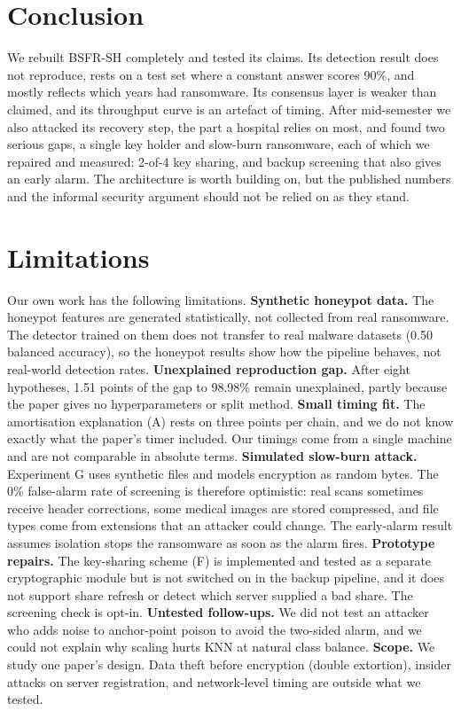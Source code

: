 \documentclass[11pt]{article}
\begin{document}
\section{Conclusion}
We rebuilt BSFR-SH completely and tested its claims. Its detection result does not reproduce,
rests on a test set where a constant answer scores 90\%, and mostly reflects which years had
ransomware. Its consensus layer is weaker than claimed, and its throughput curve is an artefact of
timing. After mid-semester we also attacked its recovery step, the part a hospital relies on most,
and found two serious gaps, a single key holder and slow-burn ransomware, each of which we
repaired and measured: 2-of-4 key sharing, and backup screening that also gives an early alarm.
The architecture is worth building on, but the published numbers and the informal security
argument should not be relied on as they stand.

\section*{Limitations}
Our own work has the following limitations.
\textbf{Synthetic honeypot data.} The honeypot features are generated statistically, not collected
from real ransomware. The detector trained on them does not transfer to real malware datasets
(0.50 balanced accuracy), so the honeypot results show how the pipeline behaves, not real-world
detection rates.
\textbf{Unexplained reproduction gap.} After eight hypotheses, 1.51 points of the gap to 98.98\%
remain unexplained, partly because the paper gives no hyperparameters or split method.
\textbf{Small timing fit.} The amortisation explanation (A) rests on three points per chain, and we
do not know exactly what the paper's timer included. Our timings come from a single machine and
are not comparable in absolute terms.
\textbf{Simulated slow-burn attack.} Experiment G uses synthetic files and models encryption as
random bytes. The 0\% false-alarm rate of screening is therefore optimistic: real scans sometimes
receive header corrections, some medical images are stored compressed, and file types come from
extensions that an attacker could change. The early-alarm result assumes isolation stops the
ransomware as soon as the alarm fires.
\textbf{Prototype repairs.} The key-sharing scheme (F) is implemented and tested as a separate
cryptographic module but is not switched on in the backup pipeline, and it does not support share
refresh or detect which server supplied a bad share. The screening check is opt-in.
\textbf{Untested follow-ups.} We did not test an attacker who adds noise to anchor-point poison to
avoid the two-sided alarm, and we could not explain why scaling hurts KNN at natural class
balance.
\textbf{Scope.} We study one paper's design. Data theft before encryption (double extortion),
insider attacks on server registration, and network-level timing are outside what we tested.
\end{document}

